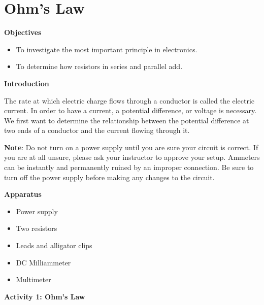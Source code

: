 
\section{Ohm's Law}

\makelabheader %

\textbf{Objectives}

\begin{itemize}
\item To investigate the most important principle in electronics.
\item To determine how resistors in series and parallel add.
\end{itemize}
\textbf{Introduction}

The rate at which electric charge flows through a conductor is called
the electric current. In order to have a current, a potential difference,
or voltage is necessary. We first want to determine the relationship
between the potential difference at two ends of a conductor and the
current flowing through it.

\textbf{Note}: Do not turn on a power supply until you are sure your
circuit is correct. If you are at all unsure, please ask your instructor
to approve your setup. Ammeters can be instantly and permanently ruined
by an improper connection. Be sure to turn off the power supply before
making any changes to the circuit.

\textbf{Apparatus}

\begin{itemize}
\item Power supply
\item Two resistors
\item Leads and alligator clips
\item DC Milliammeter
\item Multimeter
\end{itemize}
\textbf{Activity 1: Ohm's Law}


